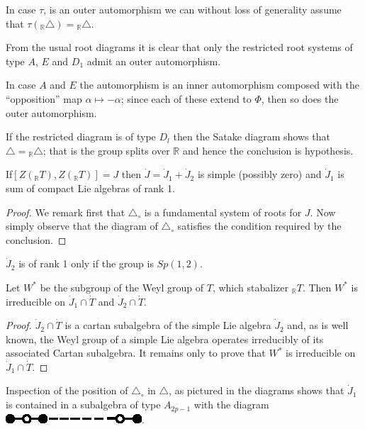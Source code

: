 In case $\tau$, is an outer automorphism we can without loss of
generality assume that $\tau ({}_\mathbb{R}\triangle)=
{}_\mathbb{R}\triangle$.

From the usual root diagrams it is clear that only the restricted root
systems of type $A$, $E$ and $D_1$ admit an outer automorphism.

In case $A$ and $E$ the automorphism is an inner automorphism composed
with the ``opposition'' map $\alpha \mapsto -\alpha$; since each of
these extend to $\Phi$, then so does the outer automorphism.

If the restricted diagram is of type $D_l$ then the Satake diagram
shows that $\triangle= {}_\mathbb{R}\triangle$; that is the group splits
over $\mathbb{R}$ and hence the conclusion is hypothesis.

\begin{lemma} \label{chap6:lem6.2}
  If\pageoriginale $[Z({}_\mathbb{R}T), Z({}_\mathbb{R}T)]= J$ then
  $\dot{J} = \dot{J}_1 + \dot{J}_2$ is simple (possibly zero) and
  $\dot{J}_1$ is sum of compact Lie algebras of rank 1.
\end{lemma}

\begin{proof}
  We remark first that $\triangle_\circ$ is a fundamental system of
  roots for $J$. Now simply observe that the diagram of
  $\triangle_\circ$ satisfies the condition required by the conclusion.
\end{proof}

\begin{note}
  $\dot{J}_2$ is of rank 1 only if the group is $Sp(1, 2)$.
\end{note}

\begin{lemma} \label{chap6:lem6.3}
  Let $W^*$ be the subgroup of the Weyl group of $T$, which stabalizer
  ${}_\mathbb{R}T$. Then $W^*$ is irreducible on $\dot{J}_1 \cap
  \dot{T}$ and $\dot{J}_2 \cap \dot{T}$.  
\end{lemma}

\begin{proof}
  $\dot{J}_2 \cap \dot{T}$ is a cartan subalgebra of the simple Lie
  algebra $\dot{J}_2$ and, as is well known, the Weyl group of a
  simple Lie algebra operates irreducibly of its associated Cartan
  subalgebra. It remains only to prove that $W^*$ is irreducible on
  $\dot{J}_1 \cap \dot{T}$.
\end{proof}

Inspection of the position of $\triangle_\circ$ in $\triangle$, as
pictured in the diagrams shows that $\dot{J}_1$ is contained in a
subalgebra of type $A_{2p-1}$ with the diagram \quad 
\includegraphics{figures48/fig48-27.eps}. 


